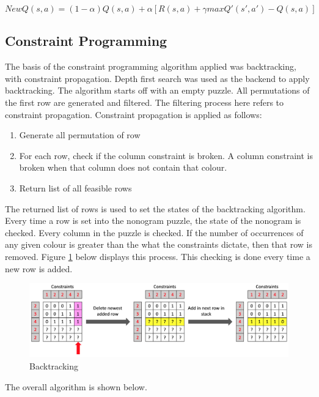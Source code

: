 \documentclass{svproc}
\begin{document}
\begin{equation}
	NewQ(s, a) = (1 - \alpha)Q(s,a) + \alpha[R(s,a) + \gamma maxQ'(s', a') - Q(s,a)]
\end{equation}

\subsection{Constraint Programming}
The basis of the constraint programming algorithm applied was backtracking, with constraint propagation. Depth first search was used as the backend to apply backtracking. The algorithm starts off with an empty puzzle. All permutations of the first row are generated and filtered. The filtering process here refers to  constraint propagation. Constraint propagation is applied as follows:

\begin{enumerate}
    \item Generate all permutation of row
    \item For each row, check if the column constraint is broken. A column constraint is broken when that column does not contain that colour.
    \item Return list of all feasible rows
\end{enumerate}

The returned list of rows is used to set the states of the backtracking algorithm. Every time a row is set into the nonogram puzzle, the state of the nonogram is checked. Every column in the puzzle is checked. If the number of occurrences of any given colour is greater than the what the constraints dictate, then that row is removed. Figure \ref{fig:Backtrack} below displays this process. This checking is done every time a new row is added.

\begin{figure}[h]
    \centering
    \includegraphics[scale=0.36]{Backtracking.png}
    \caption{Backtracking}
    \label{fig:Backtrack}
\end{figure}

The overall algorithm is shown below.
\end{document}
